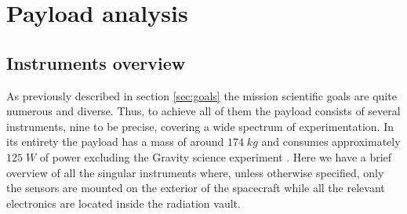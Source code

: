 \section{Payload analysis}
\label{sec:payload}

\subsection{Instruments overview}
As previously described in section \ref{sec:goals} the mission scientific goals are quite numerous and diverse. Thus, to achieve all of them the payload consists of several instruments, nine to be precise, covering a wide spectrum of experimentation. In its entirety the payload has a mass of around $174 \;kg$ and consumes approximately $125 \;W$ of power excluding the Gravity science experiment \cite{Key_requirmetns}.
Here we have a brief overview of all the singular instruments where, unless otherwise specified, only the sensors are mounted on the exterior of the spacecraft while all the relevant electronics are located inside the radiation vault. 

